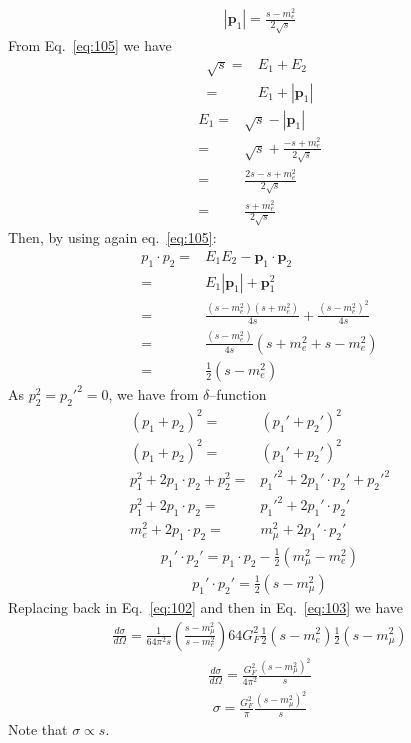 \begin{align}
  |\mathbf{p}_1|=\frac{s-m_e^2}{2\sqrt{s}}
\end{align}
From Eq.~\eqref{eq:105} we have
\begin{align}
  \sqrt{s}=&E_1+E_2\nonumber\\
  =&E_1+|\mathbf{p}_1|
\end{align}
\begin{align}
  E_1=&\sqrt{s}-|\mathbf{p}_1|\nonumber\\
  =&\sqrt{s}+\frac{-s+m_e^2}{2\sqrt{s}}\nonumber\\
  =&\frac{2s-s+m_e^2}{2\sqrt{s}}\nonumber\\
  =&\frac{s+m_e^2}{2\sqrt{s}}
\end{align}
Then, by using again eq.~\eqref{eq:105}:
\begin{align}
  p_1\cdot p_2=&E_1E_2-\mathbf{p}_1\cdot\mathbf{p}_2\nonumber\\
  =&E_1|\mathbf{p}_1|+\mathbf{p}_1^2\nonumber\\
=&\frac{(s-m_e^2)(s+m_e^2)}{4s}+\frac{(s-m_e^2)^2}{4s}\nonumber\\
=&\frac{(s-m_e^2)}{4s}(s+m_e^2+s-m_e^2)\nonumber\\
=&\frac{1}{2}(s-m_e^2) 
\end{align}
As $p_2^2={p_2'}^2=0$, we have from $\delta$--function
\begin{align}
  (p_1+p_2)^2=&(p_1'+p_2')^2\nonumber\\
  (p_1+p_2)^2=&(p_1'+p_2')^2\nonumber\\
  p_1^2+2p_1\cdot p_2+p_2^2=&{p_1'}^2+2p_1'\cdot p_2'+{p_2'}^2\nonumber\\
  p_1^2+2p_1\cdot p_2=&{p_1'}^2+2p_1'\cdot p_2'\nonumber\\
  m_e^2+2p_1\cdot p_2=&m_\mu^2+2p_1'\cdot p_2'
\end{align}
\begin{align}
  p_1'\cdot p_2'=p_1\cdot p_2-\frac{1}{2}(m_\mu^2-m_e^2)
\end{align}
\begin{align}
  p_1'\cdot p_2'=\frac{1}{2}(s-m_\mu^2) 
\end{align}
Replacing back in Eq.~\eqref{eq:102} and then in Eq.~\eqref{eq:103} we have
\begin{align}
  \frac{d\sigma}{d\Omega}=\frac{1}{64\pi^2s}\left(\frac{s-m_\mu^2}{s-m_e^2}\right)
64G_F^2\frac{1}{2}(s-m_e^2)\frac{1}{2}(s-m_\mu^2)
\end{align} 
\begin{align}
    \frac{d\sigma}{d\Omega}=\frac{G_F^2}{4\pi^2}\frac{(s-m_\mu^2)^2}{s}
\end{align}
\begin{align}
\sigma  =\frac{G_F^2}{\pi}\frac{(s-m_\mu^2)^2}{s}
\end{align}
Note that $\sigma\propto s$.


